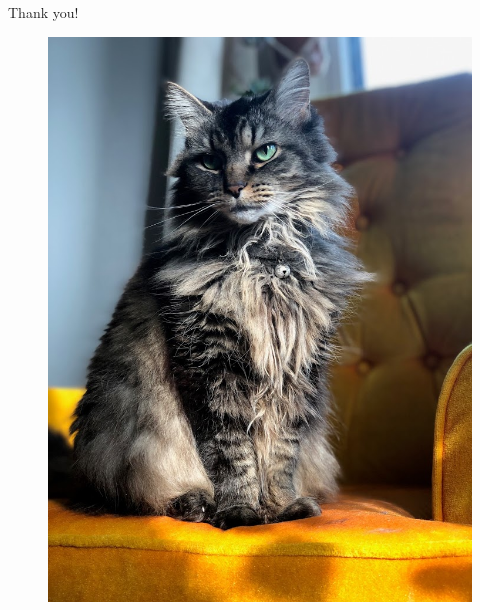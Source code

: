 \documentclass[xcolor=dvipsnames,aspectratio=169]{beamer}
\begin{document}
\begin{frame}
    Thank you!
\begin{figure}
    \centering
   \includegraphics[scale = 0.5]{thank_you.JPG}
\end{figure}
\end{frame} 
\end{document}
